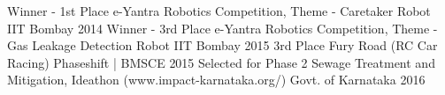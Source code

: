 \begin{cvhonors}
  \cvhonor
    {Winner - 1st Place}
    {e-Yantra Robotics Competition, Theme - Caretaker Robot}
    {IIT Bombay}
    {2014}
  \cvhonor
    {Winner - 3rd Place}
    {e-Yantra Robotics Competition, Theme - Gas Leakage Detection Robot}
    {IIT Bombay}
    {2015}
    \cvhonor
    {3rd Place}
    {Fury Road (RC Car Racing)}
    {Phaseshift | BMSCE}
    {2015}
  \cvhonor
    {Selected for Phase 2}
    {Sewage Treatment and Mitigation, Ideathon (www.impact-karnataka.org/)}
    {Govt. of Karnataka}
    {2016}
    
\end{cvhonors}
